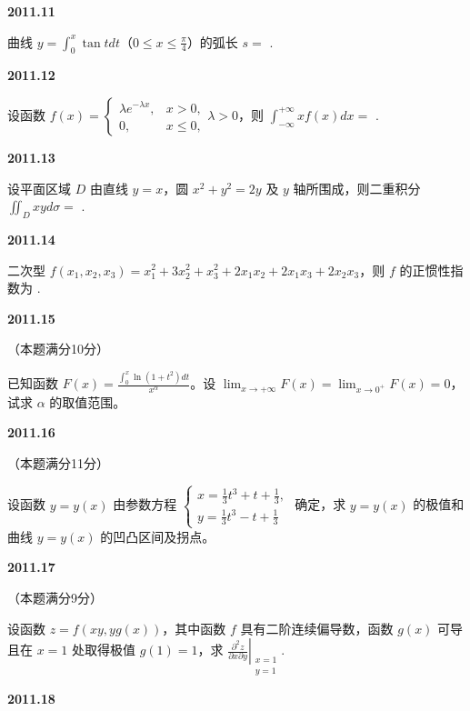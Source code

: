 \documentclass[UTF8,12pt,fontset=windows]{ctexart}
\begin{document}
\vfill
\newpage
{\large\bfseries 2011.11}

曲线 $y = \int_0^x \tan t dt$（$0 \le x \le \frac{\pi}{4}$）的弧长 $s =$ \underline{\hspace{20mm}}.

\vfill
\newpage
{\large\bfseries 2011.12}

设函数 $f(x) = \begin{cases} \lambda e^{-\lambda x}, & x > 0, \\ 0, & x \le 0, \end{cases} \lambda > 0$，则 $\int_{-\infty}^{+\infty} x f(x)dx =$ \underline{\hspace{20mm}}.

\vfill
\newpage
{\large\bfseries 2011.13}

设平面区域 $D$ 由直线 $y = x$，圆 $x^2 + y^2 = 2y$ 及 $y$ 轴所围成，则二重积分 $\iint_D xy d\sigma =$ \underline{\hspace{20mm}}.

\vfill
\newpage
{\large\bfseries 2011.14}

二次型 $f(x_1, x_2, x_3) = x_1^2 + 3x_2^2 + x_3^2 + 2x_1x_2 + 2x_1x_3 + 2x_2x_3$，则 $f$ 的正惯性指数为 \underline{\hspace{20mm}}.

\vfill
\newpage
{\large\bfseries 2011.15}

（本题满分10分）

已知函数 $F(x) = \frac{\int_0^x \ln(1 + t^2)dt}{x^\alpha}$。设 $\lim_{x \to +\infty}F(x) = \lim_{x \to 0^+}F(x) = 0$，试求 $\alpha$ 的取值范围。

\vfill
\newpage
{\large\bfseries 2011.16}

（本题满分11分）

设函数 $y = y(x)$ 由参数方程 $\begin{cases} x = \frac{1}{3}t^3 + t + \frac{1}{3}, \\ y = \frac{1}{3}t^3 - t + \frac{1}{3} \end{cases}$ 确定，求 $y = y(x)$ 的极值和曲线 $y = y(x)$ 的凹凸区间及拐点。

\vfill
\newpage
{\large\bfseries 2011.17}

（本题满分9分）

设函数 $z = f(xy, yg(x))$，其中函数 $f$ 具有二阶连续偏导数，函数 $g(x)$ 可导且在 $x = 1$ 处取得极值 $g(1) = 1$，求 $\left.\frac{\partial^2 z}{\partial x \partial y}\right|_{\substack{x = 1 \\ y = 1}}$.

\vfill
\newpage
{\large\bfseries 2011.18}
\end{document}
